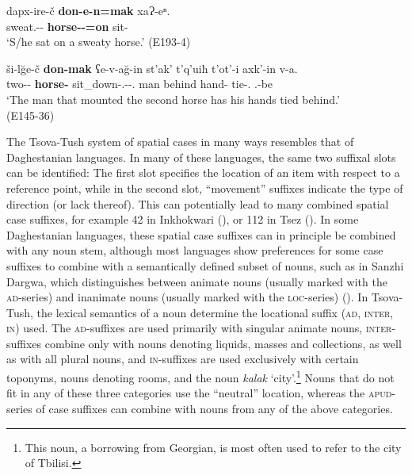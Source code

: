 \begin{exe}
	\ex\label{simplenp-ex48}
	\begin{xlist}
		
		
			\ex\label{simplenp-ex48a}
			\gll dapx-ire-č \textbf{don-e-n=mak} xaɁ-eⁿ. \\
			sweat.{\Obl}-{\Adjz}-{\Obl} \textbf{horse-{\Obl}-{\Dat}=on} sit-{\Aor} \\
			\trans `S/he sat on a sweaty horse.'
			\hfill (E193-4)
		
		
		
			\ex\label{simplenp-ex48b}
			\gll ši-l\u{g}e-č \textbf{don-mak} ʕe-v-a\u{g}-in st'ak' t'q'uiħ t'ot'-i axk'-in v-a. \\
			two-{\Ord}-{\Obl} \textbf{horse-{\Superlat}} sit\_down-{\M}.{\Sg}-{\Lv}-{\Ptcp}.{\Aor} man behind hand-{\Pl} tie-{\Ptcp}.{\Pst} {\M}.{\Sg}-be \\
			\trans `The man that mounted the second horse has his hands tied behind.' \\
			\hfill (E145-36)
		
		
	\end{xlist}
	
\end{exe}


The Tsova-Tush system of spatial cases in many ways resembles that of Daghestanian languages. In many of these languages, the same two suffixal slots can be identified: The first slot specifies the location of an item with respect to a reference point, while in the second slot, ``movement'' suffixes indicate the type of direction (or lack thereof). This can potentially lead to many combined spatial case suffixes, for example 42 in Inkhokwari (\cite{khalilova09}), or 112 in Tsez (\cite[103]{comriepolinsky98}). In some Daghestanian languages, these spatial case suffixes can in principle be combined with any noun stem, although most languages show preferences for some case suffixes to combine with a semantically defined subset of nouns, such as in Sanzhi Dargwa, which distinguishes between animate nouns (usually marked with the \textsc{ad}-series) and inanimate nouns (usually marked with the \textsc{loc}-series) (\cite[64]{forker20}). In Tsova-Tush, the lexical semantics of a noun determine the locational suffix (\textsc{ad, inter, in}) used. The \textsc{ad}-suffixes are used primarily with singular animate nouns, \textsc{inter}-suffixes combine only with nouns denoting liquids, masses and collections, as well as with all plural nouns, and \textsc{in}-suffixes are used exclusively with certain toponyms, nouns denoting rooms, and the noun \textit{kalak} `city'.\footnote{This noun, a borrowing from Georgian, is most often used to refer to the city of Tbilisi.} Nouns that do not fit in any of these three categories use the ``neutral'' location, whereas the \textsc{apud}-series of case suffixes can combine with nouns from any of the above categories.


